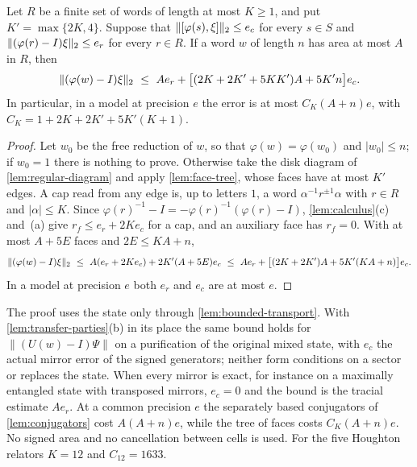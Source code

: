 \begin{theorem}\label{thm:linear-filling}
Let $R$ be a finite set of words of length at most $K\ge1$, and put $K'=\max\{2K,4\}$. Suppose that $\lVert [\varphi(s),\xi]\rVert_2\le e_c$
for every $s\in S$ and $\lVert (\varphi(r)-I)\xi\rVert_2\le e_r$ for every $r\in R$. If a word $w$ of length $n$ has area at most $A$ in $R$,
then
\[
\hs{(\varphi(w)-I)\xi}\ \le\ Ae_r+\bigl[(2K+2K'+5KK')A+5K'n\bigr]e_c .
\]
In particular, in a model at precision $e$ the error is at most $C_K(A+n)e$, with $C_K=1+2K+2K'+5K'(K+1)$.
\end{theorem}

\begin{proof}
Let $w_0$ be the free reduction of $w$, so that $\varphi(w)=\varphi(w_0)$ and $|w_0|\le n$; if $w_0=1$ there is nothing to prove.
Otherwise take the disk diagram of \cref{lem:regular-diagram} and apply \cref{lem:face-tree}, whose faces have at most $K'$
edges. A cap read from any edge is, up to letters $1$, a word $\alpha^{-1}r^{\pm1}\alpha$ with $r\in R$ and $|\alpha|\le K$. Since
$\varphi(r)^{-1}-I=-\varphi(r)^{-1}(\varphi(r)-I)$, \cref{lem:calculus}(c) and~(a) give $r_f\le e_r+2Ke_c$ for a cap, and an auxiliary
face has $r_f=0$. With at most $A+5E$ faces and $2E\le KA+n$,
\[
\hs{(\varphi(w)-I)\xi}\ \le\ A(e_r+2Ke_c)+2K'(A+5E)e_c\ \le\ Ae_r+\bigl[(2K+2K')A+5K'(KA+n)\bigr]e_c .
\]
In a model at precision $e$ both $e_r$ and $e_c$ are at most $e$.
\end{proof}

\begin{remark}\label{rem:linear-filling}
The proof uses the state only through \cref{lem:bounded-transport}. With \cref{lem:transfer-parties}(b) in its place the same
bound holds for $\|(U(w)-I)\Psi\|$ on a purification of the original mixed state, with $e_c$ the actual mirror error of the signed
generators; neither form conditions on a sector or replaces the state. When every mirror is exact, for instance on a maximally
entangled state with transposed mirrors, $e_c=0$ and the bound is the tracial estimate $Ae_r$. At a common precision $e$ the
separately based conjugators of \cref{lem:conjugators} cost $A(A+n)e$, while the tree of faces costs $C_K(A+n)e$. No signed area
and no cancellation between cells is used. For the five Houghton relators $K=12$ and $C_{12}=1633$.
\end{remark}


